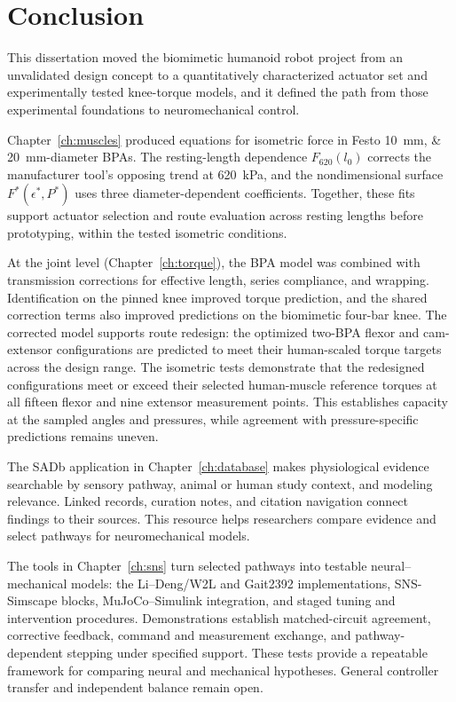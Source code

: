 \chapter{Conclusion}\label{ch:conclusion}
\graphicspath{{../Figures/80-conclusion/}{figs/80-conclusion/}}

This dissertation moved the biomimetic humanoid robot project from an unvalidated design concept to a quantitatively characterized actuator set and experimentally tested knee-torque models, and it defined the path from those experimental foundations to neuromechanical control.

Chapter~\ref{ch:muscles} produced equations for isometric force in Festo \qtylist{10;20}{\mm}-diameter BPAs. The resting-length dependence $F_{620}(l_0)$ corrects the manufacturer tool's opposing trend at \qty{620}{\kPa}, and the nondimensional surface $F^*(\epsilon^*,P^*)$ uses three diameter-dependent coefficients. Together, these fits support actuator selection and route evaluation across resting lengths before prototyping, within the tested isometric conditions.

At the joint level (Chapter~\ref{ch:torque}), the BPA model was combined with transmission corrections for effective length, series compliance, and wrapping. Identification on the pinned knee improved torque prediction, and the shared correction terms also improved predictions on the biomimetic four-bar knee. The corrected model supports route redesign: the optimized two-BPA flexor and cam-extensor configurations are predicted to meet their human-scaled torque targets across the design range. The isometric tests demonstrate that the redesigned configurations meet or exceed their selected human-muscle reference torques at all fifteen flexor and nine extensor measurement points. This establishes capacity at the sampled angles and pressures, while agreement with pressure-specific predictions remains uneven.

The SADb application in Chapter~\ref{ch:database} makes physiological evidence searchable by sensory pathway, animal or human study context, and modeling relevance. Linked records, curation notes, and citation navigation connect findings to their sources. This resource helps researchers compare evidence and select pathways for neuromechanical models.

The tools in Chapter~\ref{ch:sns} turn selected pathways into testable neural--mechanical models: the Li--Deng/W2L and Gait2392 implementations, SNS-Simscape blocks, MuJoCo--Simulink integration, and staged tuning and intervention procedures. Demonstrations establish matched-circuit agreement, corrective feedback, command and measurement exchange, and pathway-dependent stepping under specified support. These tests provide a repeatable framework for comparing neural and mechanical hypotheses. General controller transfer and independent balance remain open.


